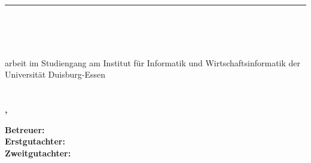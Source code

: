 %

\begin{titlepage}
\rule{\textwidth}{0.4pt} \\[48pt]
\begin{center}
\begin{spacing}{2}
\textbf{\textsf{\Huge \titel}} \\
\textsf{\Large \untertitel}\\[52pt]

\textsf{\Large {\arbeitsart}arbeit im Studiengang {\studiengang} am Institut für Informatik und
Wirtschaftsinformatik der Universität Duisburg-Essen}\\[36pt]
\textbf{\textsf{\Large {\vorname} {\nachname} \\ {\matrikelnummer}}}\\[26pt]
\textbf{\textsf{\Large {\ort}, \datum}}
\end{spacing}
\end{center}
\textbf{Betreuer: \betreuer \\
\ifx\erstgutachter\undefined
\else
Erstgutachter: \erstgutachter \\
  \ifx\zweitgutachter\undefined
  \else
  Zweitgutachter: \zweitgutachter \\
  \fi
\fi
}
\end{titlepage}